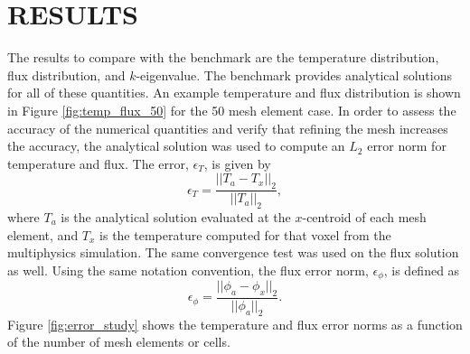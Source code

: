 \documentclass[letterpaper]{mc2023}
\begin{document}
\section{RESULTS}\label{sec:results}
The results to compare with the benchmark are the temperature distribution, flux distribution, and $k$-eigenvalue. The benchmark provides
analytical solutions for all of these quantities. An example temperature and flux distribution is shown in Figure \ref{fig:temp_flux_50}
for the 50 mesh element case. In order to assess the accuracy of the numerical quantities and verify that refining the mesh increases the
accuracy, the analytical solution was used to compute an $L_{2}$ error norm for temperature and flux. The error, $\epsilon_{T}$, is given by
\begin{equation}
    \epsilon_{T} = \frac{|| T_{a} - T_{x} ||_{2}}{|| T_{a} ||_{2}},
\end{equation}
where $T_{a}$ is the analytical solution evaluated at the $x$-centroid of each mesh element, and $T_{x}$ is the temperature computed for that
voxel from the multiphysics simulation. The same convergence test was used on the flux solution as well. Using the same notation convention,
the flux error norm, $\epsilon_{\phi}$, is defined as
\begin{equation}
    \epsilon_{\phi} =  \frac{|| \phi_{a} - \phi_{x} ||_{2}}{|| \phi_{a} ||_{2}}.
\end{equation}
Figure \ref{fig:error_study} shows the temperature and flux error norms as a function of the number of mesh elements or cells.
\end{document}
